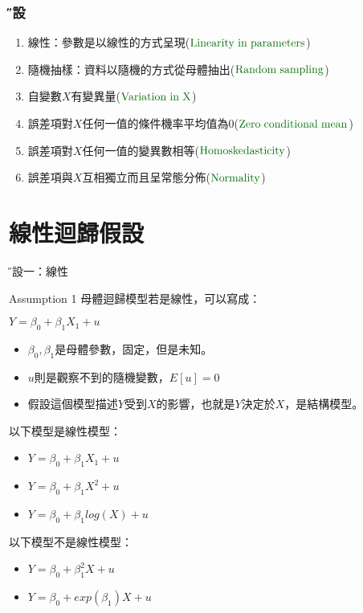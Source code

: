 \documentclass[xcolor=dvipsnames]{beamer}
\begin{document}
\begin{frame}\frametitle{\H 假設}
\begin{enumerate}
\item 線性：參數是以線性的方式呈現($\color{rgb:red,4;yellow,3}{\mathrm {Linearity\hspace{.3em} in\hspace{.3em} parameters}}$)
\item 隨機抽樣：資料以隨機的方式從母體抽出($\color{rgb:red,4;yellow,3}{\mathrm {Random \hspace{.3em}sampling}}$)
\item 自變數$X$有變異量($\color{rgb:red,4;yellow,3}{\mathrm {Variation\hspace{.3em} in\hspace{.3em} X}}$)
\item {\K 誤差項}對$X$任何一值的條件機率平均值為0($\color{rgb:red,4;yellow,3}{\mathrm {Zero\hspace{.3em} conditional\hspace{.3em} mean}}$)
\item {\K 誤差項}對$X$任何一值的變異數相等($\color{rgb:red,4;yellow,3}{\mathrm {Homoskedasticity}}$)
\item {\K 誤差項}與$X$互相獨立而且呈常態分佈($\color{rgb:red,4;yellow,3}{\mathrm {Normality}}$)
\end{enumerate}
\end{frame}
\section{線性迴歸假設}
\begin{frame}{\H 假設一：線性}
\begin{block}{Assumption 1}
母體迴歸模型若是線性，可以寫成：
\begin{center}
$Y=\beta_{0}+\beta_{1}X_{1}+u$
\end{center}
\end{block}
\begin{itemize}
\item $\beta_{0},\beta_{1}$是母體參數，固定，但是未知。\\
\item $u$則是觀察不到的隨機變數，$E[u]=0$\\
\item 假設這個模型描述$Y$受到$X$的影響，也就是$Y$決定於$X$，是結構模型。
\end{itemize}
以下模型是線性模型：
\begin{itemize}
\item $Y=\beta_{0}+\beta_{1}X_{1}+u$
\item $Y=\beta_{0}+\beta_{1}X^2+u$
\item $Y=\beta_{0}+\beta_{1}log(X)+u$
\end{itemize}
以下模型不是線性模型：
\begin{itemize}
\item $Y=\beta_{0}+\beta_{1}^{2}X+u$
\item $Y=\beta_{0}+exp(\beta_{1})X+u$
\end{itemize}
\end{frame}
\end{document}
